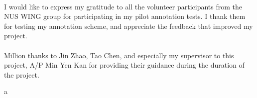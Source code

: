 \documentclass[hyp]{socreport}
\begin{document}
\begin{acknowledgement}
\paragraph{}
I would like to express my gratitude to all the volunteer participants from the NUS WING group for participating in my pilot annotation tests. I thank them for testing my annotation scheme, and appreciate the feedback that improved my project.

\paragraph{}
Million thanks to Jin Zhao, Tao Chen, and especially my supervisor to this project, A/P Min Yen Kan for providing their guidance during the duration of the project.
\end{acknowledgement}

\listoffigures
\listoftables
\tableofcontents
a






 



\appendix

\end{document}

